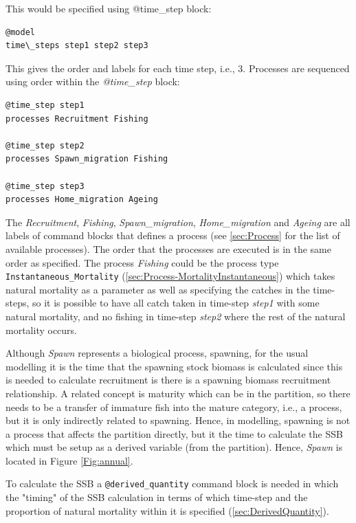 This would be specified using @time\_step block:

{\small{\begin{verbatim}
@model
time\_steps step1 step2 step3
\end{verbatim}}}

This gives the order and labels for each time step, i.e., 3. Processes are sequenced using order within the \textit{@time\_step} block:

{\small{\begin{verbatim}
@time_step step1
processes Recruitment Fishing

@time_step step2
processes Spawn_migration Fishing

@time_step step3
processes Home_migration Ageing
\end{verbatim}}}

The \emph{Recruitment}, \emph{Fishing}, \emph{Spawn\_migration}, \emph{Home\_migration} and \emph{Ageing} are all labels of command blocks that defines a process (see \ref{sec:Process} for the list of available processes). The order that the  processes are executed is in the same order as specified. The process \emph{Fishing} could be the process type \texttt{Instantaneous\_Mortality} (\ref{sec:Process-MortalityInstantaneous}) which takes natural mortality as a parameter as well as specifying the catches in the time-steps, so it is possible to have all catch taken in time-step \emph{step1} with some natural mortality, and no fishing in time-step \emph{step2} where the rest of the natural mortality occurs.

Although \emph{Spawn} represents a biological process, spawning, for the usual modelling it is the time that the spawning stock biomass is calculated since this is needed to calculate recruitment is there is a spawning biomass recruitment relationship. A related concept is maturity which can be in the partition, so there needs to be a transfer of immature fish into the mature category, i.e., a process, but it is only indirectly related to spawning. Hence, in modelling, spawning is not a process that affects the partition directly, but it the time to calculate the SSB which must be setup as a derived variable (from the partition). Hence, \emph{Spawn} is located in Figure \ref{Fig:annual}.

To calculate the SSB a \texttt{@derived\_quantity} command block is needed in which the "timing" of the SSB calculation in terms of which time-step and the proportion of natural mortality within it is specified (\ref{sec:DerivedQuantity}).

